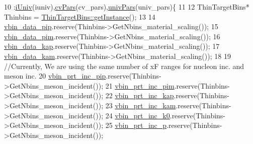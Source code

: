 \begin{DoxyCode}
10                                                                                                            
                                :\hyperlink{class_neutrino_flux_reweight_1_1_thin_targetnucleon_a_reweighter_a546b2c322fe357472e17a4a901bd2212}{iUniv}(iuniv),\hyperlink{class_neutrino_flux_reweight_1_1_thin_targetnucleon_a_reweighter_aa2690e0e126d75bbcb68ec28c8c4811a}{cvPars}(cv\_pars),\hyperlink{class_neutrino_flux_reweight_1_1_thin_targetnucleon_a_reweighter_a56d10ce15819c77e9d4a6538f403b71e}{univPars}(univ\_pars)\{
11     
12     ThinTargetBins* Thinbins =  \hyperlink{class_neutrino_flux_reweight_1_1_thin_target_bins_aeff5cf7220dd08322f5abac2cbc7ff33}{ThinTargetBins::getInstance}();
13     
14     \hyperlink{class_neutrino_flux_reweight_1_1_thin_targetnucleon_a_reweighter_ae7012b962ce5fc1297fe56722661532a}{vbin\_data\_pip}.reserve(Thinbins->GetNbins\_material\_scaling());
15     \hyperlink{class_neutrino_flux_reweight_1_1_thin_targetnucleon_a_reweighter_ae0b6c63ce05db44c64d8b272ce3cbaed}{vbin\_data\_pim}.reserve(Thinbins->GetNbins\_material\_scaling());
16     \hyperlink{class_neutrino_flux_reweight_1_1_thin_targetnucleon_a_reweighter_acfadbda1695d49d43efe9e5a5395317b}{vbin\_data\_kap}.reserve(Thinbins->GetNbins\_material\_scaling());
17     \hyperlink{class_neutrino_flux_reweight_1_1_thin_targetnucleon_a_reweighter_ae434ebe9822621ab7e5250b4057a883d}{vbin\_data\_kam}.reserve(Thinbins->GetNbins\_material\_scaling());
18     
19     \textcolor{comment}{//Currently, We are using the same number of xF ranges for nucleon inc. and meson inc.}
20     \hyperlink{class_neutrino_flux_reweight_1_1_thin_targetnucleon_a_reweighter_a62d37535ba63cd757dcf40763a66d459}{vbin\_prt\_inc\_pip}.reserve(Thinbins->GetNbins\_meson\_incident());
21     \hyperlink{class_neutrino_flux_reweight_1_1_thin_targetnucleon_a_reweighter_ae1652fcc9e3b525b169b0bcb8bf22a1c}{vbin\_prt\_inc\_pim}.reserve(Thinbins->GetNbins\_meson\_incident());
22     \hyperlink{class_neutrino_flux_reweight_1_1_thin_targetnucleon_a_reweighter_a82e5925cc95dfa54adbb6b0f5af89444}{vbin\_prt\_inc\_kap}.reserve(Thinbins->GetNbins\_meson\_incident());
23     \hyperlink{class_neutrino_flux_reweight_1_1_thin_targetnucleon_a_reweighter_a846d581016c8e15e5528c64fdc5a6fee}{vbin\_prt\_inc\_kam}.reserve(Thinbins->GetNbins\_meson\_incident());
24     \hyperlink{class_neutrino_flux_reweight_1_1_thin_targetnucleon_a_reweighter_abc9e0de56770183d6108172ae1673b6d}{vbin\_prt\_inc\_k0}.reserve(Thinbins->GetNbins\_meson\_incident());
25     \hyperlink{class_neutrino_flux_reweight_1_1_thin_targetnucleon_a_reweighter_a7ac18fafe93466aae51c87b6a11eea35}{vbin\_prt\_inc\_p}.reserve(Thinbins->GetNbins\_meson\_incident());

\end{DoxyCode}

